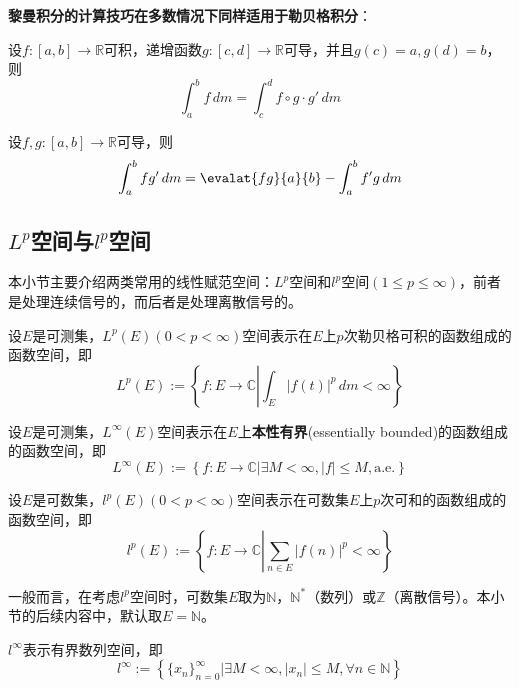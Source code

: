 \textbf{黎曼积分的计算技巧在多数情况下同样适用于勒贝格积分}：
\begin{theorem}[勒贝格积分的变量代换]
    设$f:[a,b]\to\mathbb{R}$可积，递增函数$g:[c,d]\to \mathbb{R}$可导，并且$g(c)=a,g(d)=b$，则
    \[\int_{a}^{b}f\,dm=\int_{c}^{d}f\circ g\cdot g'\,dm\]
\end{theorem}

\begin{theorem}[勒贝格积分的分部积分法]
    设$f,g:[a,b]\to\mathbb{R}$可导，则
    \[\int_{a}^{b}f g'\,dm=\evalat{fg}{a}{b}-\int_{a}^{b}f' g\,dm\]
\end{theorem}

\subsection{\texorpdfstring{$L^p$空间与$l^p$空间}{Lp空间与lp空间}}\label{sub:Lp_space}

本小节主要介绍两类常用的线性赋范空间：$L^p$空间和$l^p$空间$(1\leq p\leq \infty)$，前者是处理连续信号的，而后者是处理离散信号的。

\begin{definition}[$L^p$空间]\label{def:Lp}
    设$E$是可测集，$L^p(E)(0<p<\infty)$空间表示在$E$上$p$次勒贝格可积的函数组成的函数空间，即
    \[L^p(E):=\left\{f:E\rightarrow \mathbb{C} \left| \int_{E}|f(t)|^p\,dm<\infty\right.\right\}\]
\end{definition}

\begin{definition}[$L^{\infty}$空间]\label{def:L_infty}
    设$E$是可测集，$L^{\infty}(E)$空间表示在$E$上\textbf{本性有界}(essentially bounded)的函数组成的函数空间，即
    \[L^{\infty}(E):=\left\{f:E\rightarrow \mathbb{C} \left|\exists M<\infty,|f|\leq M,\mathrm{a.e.}\right.\right\}\]
\end{definition}

\begin{definition}[$l^p$空间]\label{def:lp}
    设$E$是可数集，$l^p(E)(0<p<\infty)$空间表示在可数集$E$上$p$次可和的函数组成的函数空间，即
    \[l^p(E):=\left\{f:E\rightarrow \mathbb{C} \left| \sum_{n\in E}|f(n)|^p<\infty\right.\right\}\]
\end{definition}

一般而言，在考虑$l^p$空间时，可数集$E$取为$\mathbb{N}$，$\mathbb{N} ^*$（数列）或$\mathbb{Z}$（离散信号）。本小节的后续内容中，默认取$E=\mathbb{N}$。

\begin{definition}[$l^{\infty}$空间]\label{def:l_infty}
    $l^{\infty}$表示有界数列空间，即
    \[l^{\infty}:=\left\{\{x_n\}_{n=0}^{\infty} \left|\exists M<\infty,|x_n|\leq M,\forall n\in \mathbb{N}\right.\right\}\]
\end{definition}

